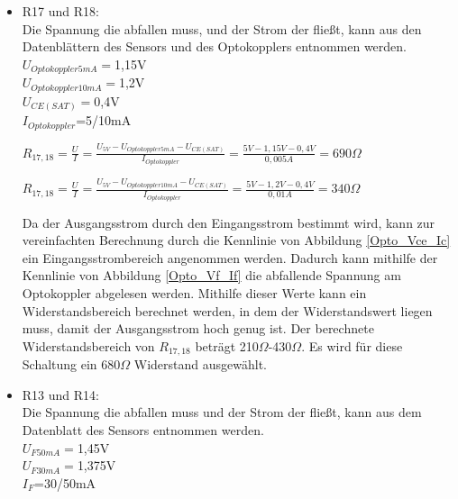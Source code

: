 \begin{itemize}
\item R17 und R18: \\
Die Spannung die abfallen muss, und der Strom der fließt, kann aus den Datenblättern des Sensors und des Optokopplers entnommen werden.\\
$U_{Optokoppler 5mA}=$1,15V \\
$U_{Optokoppler 10mA}=$1,2V \\
$U_{CE(SAT)}=$0,4V \\
$I_{Optokoppler}$=5/10mA \\

\begin{center}
$R_{17,18}=\frac{U}{I}=\frac{U_{5V}-U_{Optokoppler 5mA}-U_{CE(SAT)}}{I_{Optokoppler}}=\frac{5V-1,15V-0,4V}{0,005A}=690\Omega$
\end{center}

\begin{center}
$R_{17,18}=\frac{U}{I}=\frac{U_{5V}-U_{Optokoppler 10mA}-U_{CE(SAT)}}{I_{Optokoppler}}=\frac{5V-1,2V-0,4V}{0,01A}=340\Omega$
\end{center}

Da der Ausgangsstrom durch den Eingangsstrom bestimmt wird, kann zur vereinfachten Berechnung durch die Kennlinie von Abbildung \ref{Opto_Vce_Ic} ein Eingangsstrombereich angenommen werden. Dadurch kann mithilfe der Kennlinie von Abbildung \ref{Opto_Vf_If} die abfallende Spannung am Optokoppler abgelesen werden. Mithilfe dieser Werte kann ein Widerstandsbereich berechnet werden, in dem der Widerstandswert liegen muss, damit der Ausgangsstrom hoch genug ist. Der berechnete Widerstandsbereich von $R_{17,18}$ beträgt 210$\Omega$-430$\Omega$. Es wird für diese Schaltung ein 680$\Omega$ Widerstand ausgewählt.
\item R13 und R14:\\
Die Spannung die abfallen muss und der Strom der fließt, kann aus dem Datenblatt des Sensors entnommen werden.\\
$U_{F 50mA}=$1,45V \\
$U_{F 30mA}=$1,375V \\
$I_{F}$=30/50mA \\


\end{itemize}
